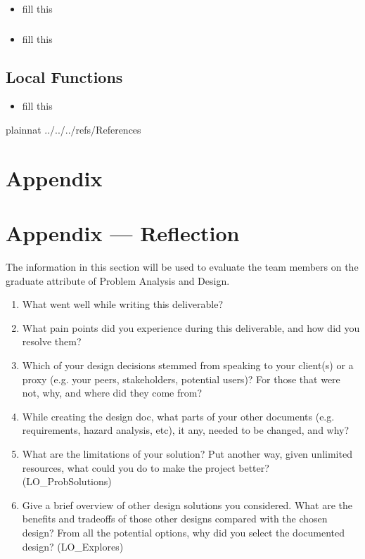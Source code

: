 \documentclass[12pt, titlepage]{article}
\begin{document}
\begin{itemize}
    \item fill this
\end{itemize}

\subsubsection{}

\begin{itemize}
    \item fill this
\end{itemize}


\subsection{Local Functions}
\begin{itemize}
    \item fill this
\end{itemize}

 {plainnat}
 {../../../refs/References}

\newpage

\section{Appendix} \label{Appendix}


\newpage{}

\section*{Appendix --- Reflection}


The information in this section will be used to evaluate the team members on the
graduate attribute of Problem Analysis and Design.



\begin{enumerate}
  \item What went well while writing this deliverable? 
  \item What pain points did you experience during this deliverable, and how
    did you resolve them?
  \item Which of your design decisions stemmed from speaking to your client(s)
  or a proxy (e.g. your peers, stakeholders, potential users)? For those that
  were not, why, and where did they come from?
  \item While creating the design doc, what parts of your other documents (e.g.
  requirements, hazard analysis, etc), it any, needed to be changed, and why?
  \item What are the limitations of your solution?  Put another way, given
  unlimited resources, what could you do to make the project better? (LO\_ProbSolutions)
  \item Give a brief overview of other design solutions you considered.  What
  are the benefits and tradeoffs of those other designs compared with the chosen
  design?  From all the potential options, why did you select the documented design?
  (LO\_Explores)
\end{enumerate}
\end{document}
